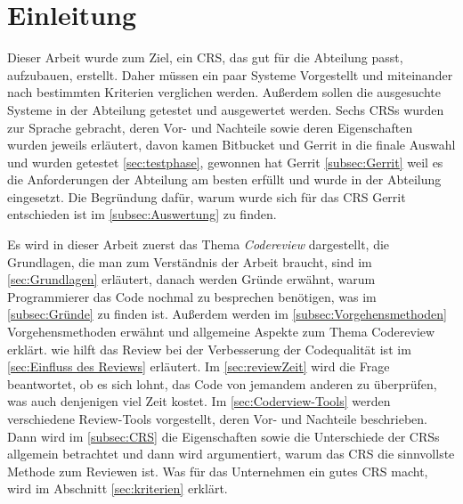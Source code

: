 \newpage

\section{Einleitung}
\label{sec:Einleitung}

Dieser Arbeit wurde zum Ziel, ein \ac{CRS}, das gut für die Abteilung passt, aufzubauen, erstellt. Daher müssen ein paar Systeme Vorgestellt und miteinander nach bestimmten Kriterien verglichen werden. Außerdem sollen die ausgesuchte Systeme in der Abteilung getestet und ausgewertet werden.
Sechs \acp{CRS} wurden zur Sprache gebracht, deren Vor- und Nachteile sowie deren Eigenschaften wurden jeweils erläutert, davon kamen Bitbucket und Gerrit in die finale Auswahl und wurden getestet \cref{sec:testphase}, gewonnen hat Gerrit \cref{subsec:Gerrit} weil es die Anforderungen der Abteilung am besten erfüllt und wurde in der Abteilung eingesetzt. Die Begründung dafür, warum wurde sich für das \ac{CRS} Gerrit entschieden ist im \cref{subsec:Auswertung} zu finden.

Es wird in dieser Arbeit zuerst das Thema \emph{Codereview} dargestellt, die Grundlagen, die man zum Verständnis der Arbeit braucht, sind im \cref{sec:Grundlagen} erläutert, danach werden Gründe erwähnt, warum Programmierer das Code nochmal zu besprechen benötigen, was im \cref{subsec:Gründe} zu finden ist. Außerdem werden im \cref{subsec:Vorgehensmethoden} Vorgehensmethoden erwähnt und allgemeine Aspekte zum Thema Codereview erklärt. wie hilft das Review bei der Verbesserung der Codequalität ist im \cref{sec:Einfluss des Reviews} erläutert. Im \cref{sec:reviewZeit} wird die Frage beantwortet, ob es sich lohnt, das Code von jemandem anderen zu überprüfen, was auch denjenigen viel Zeit kostet.
Im \cref{sec:Coderview-Tools} werden verschiedene Review-Tools vorgestellt, deren Vor- und Nachteile beschrieben. Dann wird im \cref{subsec:CRS} die Eigenschaften sowie die Unterschiede der \acp{CRS} allgemein betrachtet und dann wird argumentiert, warum das \ac{CRS} die sinnvollste Methode zum Reviewen ist. Was für das Unternehmen ein gutes \ac{CRS} macht, wird im Abschnitt \ref{sec:kriterien} erklärt.